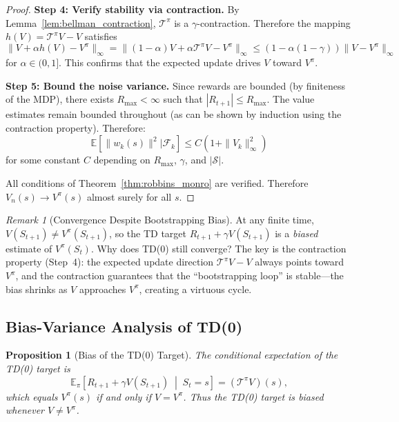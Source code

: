 \documentclass[11pt,a4paper]{article}
\theoremstyle{definition}
\theoremstyle{plain}
\newtheorem{proposition}[theorem]{Proposition}
\theoremstyle{remark}
\newtheorem{remark}{Remark}[section]
\newcommand{\E}{\mathbb{E}}
\begin{document}
\begin{proof}
\textbf{Step 4: Verify stability via contraction.} By Lemma~\ref{lem:bellman_contraction}, $\mathcal{T}^\pi$ is a $\gamma$-contraction. Therefore the mapping $h(V) = \mathcal{T}^\pi V - V$ satisfies
\begin{equation}
    \|V + \alpha h(V) - V^\pi\|_\infty = \|(1-\alpha)V + \alpha \mathcal{T}^\pi V - V^\pi\|_\infty \leq (1 - \alpha(1-\gamma))\|V - V^\pi\|_\infty
    \label{eq:td0_contraction}
\end{equation}
for $\alpha \in (0, 1]$. This confirms that the expected update drives $V$ toward $V^\pi$.

\textbf{Step 5: Bound the noise variance.} Since rewards are bounded (by finiteness of the MDP), there exists $R_{\max} < \infty$ such that $|R_{t+1}| \leq R_{\max}$. The value estimates remain bounded throughout (as can be shown by induction using the contraction property). Therefore:
\begin{equation}
    \E[\|w_k(s)\|^2 | \mathcal{F}_k] \leq C(1 + \|V_k\|_\infty^2)
    \label{eq:td0_noise_bound}
\end{equation}
for some constant $C$ depending on $R_{\max}$, $\gamma$, and $|\mathcal{S}|$.

All conditions of Theorem~\ref{thm:robbins_monro} are verified. Therefore $V_n(s) \to V^\pi(s)$ almost surely for all $s$.
\end{proof}

\begin{remark}[Convergence Despite Bootstrapping Bias]
\label{rem:bootstrap_convergence}
At any finite time, $V(S_{t+1}) \neq V^\pi(S_{t+1})$, so the TD target $R_{t+1} + \gamma V(S_{t+1})$ is a \emph{biased} estimate of $V^\pi(S_t)$. Why does TD(0) still converge? The key is the contraction property (Step~4): the expected update direction $\mathcal{T}^\pi V - V$ always points toward $V^\pi$, and the contraction guarantees that the ``bootstrapping loop'' is stable---the bias shrinks as $V$ approaches $V^\pi$, creating a virtuous cycle.
\end{remark}

\subsection{Bias-Variance Analysis of TD(0)}
\label{subsec:bias_variance}

\begin{proposition}[Bias of the TD(0) Target]
\label{prop:td0_bias}
The conditional expectation of the TD(0) target is
\begin{equation}
    \E_\pi\!\left[R_{t+1} + \gamma V(S_{t+1}) \;\middle|\; S_t = s\right] = (\mathcal{T}^\pi V)(s),
    \label{eq:td0_target_expectation}
\end{equation}
which equals $V^\pi(s)$ if and only if $V = V^\pi$. Thus the TD(0) target is \emph{biased} whenever $V \neq V^\pi$.
\end{proposition}
\end{document}
